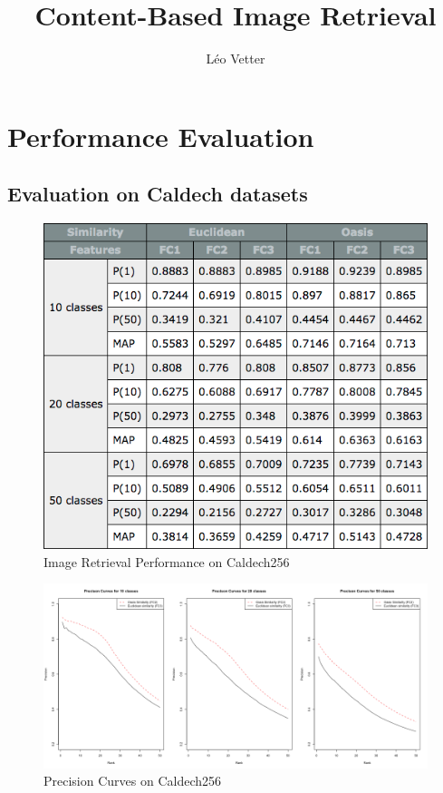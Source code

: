 \documentclass{report}
\title{Content-Based Image Retrieval}
\author{Léo Vetter}
\begin{document}
  \maketitle

  \tableofcontents

  \chapter{Performance Evaluation}

  \section{Evaluation on Caldech datasets}

    \begin{figure}[H]
      \caption{Image Retrieval Performance on Caldech256}
      \centering
      \includegraphics[scale=0.5]{images/evaluation/caldec_metrics_tables.png}
    \end{figure}

    \begin{figure}[H]
      \caption{Precision Curves on Caldech256}
      \centering
      \includegraphics[scale=0.45]{images/evaluation/caldec_prec_curves.png}
    \end{figure}
\end{document}
